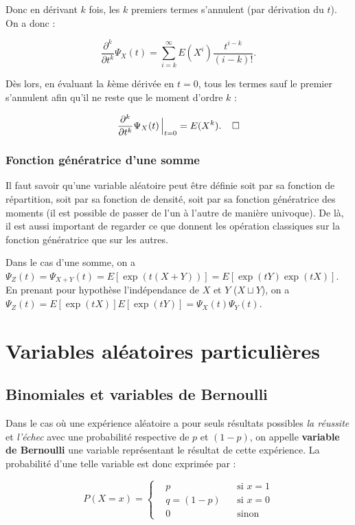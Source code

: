 \documentclass{article}
\begin{document}
		Donc en dérivant $k$ fois, les $k$ premiers termes s'annulent (par dérivation du $t$). On a donc :

		\[\frac {\partial^k}{\partial t^k}\Psi_X(t) = \sum_{i=k}^\infty E(X^i)\frac {t^{i-k}}{(i-k)!}.\]

		Dès lors, en évaluant la $k$ème dérivée en $t = 0$, tous les termes sauf le premier s'annulent afin qu'il ne reste que le moment d'ordre $k$ :

		\begin{align}
			\frac {\partial^k}{\partial t^k}\Psi_X(t)\sVert[2]_{t=0} = E(X^k).\;\;\;\;\square
		\end{align}

		\subsubsection{Fonction génératrice d'une somme}
			Il faut savoir qu'une variable aléatoire peut être définie soit par sa fonction de répartition, soit par sa fonction de densité, soit par sa fonction génératrice
			des moments (il est possible de passer de l'un à l'autre de manière univoque). De là, il est aussi important de regarder ce que donnent les opération classiques
			sur la fonction génératrice que sur les autres.

			Dans le cas d'une somme, on a $\Psi_Z(t) = \Psi_{X+Y}(t) = E[\exp(t(X+Y))] = E[\exp(tY)\exp(tX)]$. En prenant pour hypothèse l'indépendance de $X$ et $Y$
			($X \sqcup Y$), on a $\Psi_Z(t) = E[\exp(tX)]E[\exp(tY)] = \Psi_X(t)\Psi_Y(t)$.

\section{Variables aléatoires particulières}
	\subsection{Binomiales et variables de Bernoulli}
		Dans le cas où une expérience aléatoire a pour seuls résultats possibles \textit{la réussite} et \textit{l'échec} avec une probabilité respective de $p$ et $(1-p)$,
		on appelle \textbf{variable de Bernoulli} une variable représentant le résultat de cette expérience. La probabilité d'une telle variable est donc exprimée par :

		\[P(X = x) = \left\{\begin{aligned}&p &\text{ si $x = 1$}\\&q=(1-p)\;\; &\text{ si $x = 0$}\\&0 &\text{ sinon}\end{aligned}\right.\]
\end{document}
